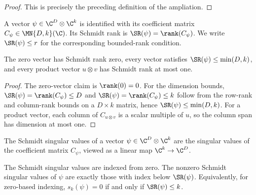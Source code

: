 \begin{proof}
    \leanok
    This is precisely the preceding definition of the ampliation.
\end{proof}

\begin{definition}\label{def:schmidt_rank}
    \leanok
    A vector $\psi\in\C^{D}\otimes\C^{k}$ is identified with its coefficient
    matrix $C_\psi\in \MN{D,k}(\C)$. Its Schmidt rank is
    $\SR(\psi)=\rank(C_\psi)$. We write $\SR(\psi)\le r$ for the corresponding
    bounded-rank condition.
\end{definition}

\begin{theorem}\label{thm:schmidt_rank_basic_bounds}
    \leanok
    The zero vector has Schmidt rank zero, every vector satisfies
    $\SR(\psi)\le \min(D,k)$, and every product vector $u\otimes v$ has
    Schmidt rank at most one.
\end{theorem}

\begin{proof}
    \leanok
    The zero-vector claim is $\rank(0)=0$. For the dimension bounds,
    $\SR(\psi)=\rank(C_\psi)\le D$ and
    $\SR(\psi)=\rank(C_\psi)\le k$ follow from the row-rank and
    column-rank bounds on a $D\times k$ matrix, hence
    $\SR(\psi)\le \min(D,k)$. For a product vector, each column
    of $C_{u\otimes v}$ is a scalar multiple of $u$, so the column span has
    dimension at most one.
\end{proof}

\begin{definition}\label{def:schmidt_singular_values}
    \leanok
    The Schmidt singular values of a vector
    $\psi\in\C^{D}\otimes\C^k$ are the singular values of the coefficient
    matrix $C_\psi$, viewed as a linear map $\C^k\to\C^D$.
\end{definition}

\begin{theorem}
    \label{thm:schmidt_singular_values_support}
    \leanok
    The Schmidt singular values are indexed from zero. The nonzero Schmidt
    singular values of $\psi$ are exactly those with index below
    $\SR(\psi)$. Equivalently, for zero-based indexing,
    $s_k(\psi)=0$ if and only if $\SR(\psi)\le k$.
\end{theorem}

